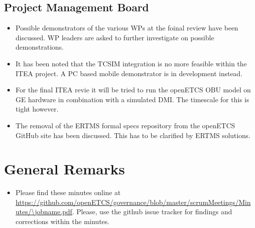 \documentclass[a4paper, 11pt]{article}
\begin{document}
\subsection{Project Management Board}
\begin{itemize}
\item Possible demonstrators of the various WPs at the foinal review have been discussed. WP leaders are asked to further investigate on possible demonstrations.
\item It has been noted that the TCSIM integration is no more feasible within the ITEA project. A PC based mobile demonstrator is in development instead.
\item For the final ITEA revie it will be tried to run the openETCS OBU model on GE hardware in combination with a simulated DMI. The timescale for this is tight however.
\item The removal of the ERTMS formal specs repository from the openETCS GitHub site has been discussed. This has to be clarified by ERTMS solutions.
\end{itemize}


\section{General Remarks}

\begin{itemize}
\item Please find these minutes online at \url{https://github.com/openETCS/governance/blob/master/scrumMeetings/Minutes/\jobname.pdf}. Please, use the github issue tracker for findings and corrections within the minutes.
\end{itemize}
\end{document}
